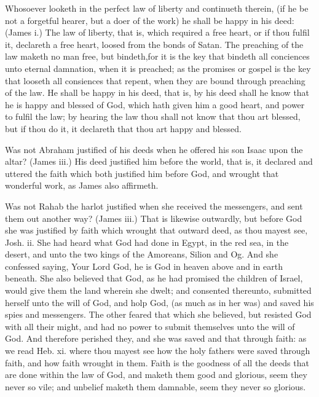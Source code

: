 Whosoever looketh in the perfect law of liberty and continueth
therein, (if he be not a forgetful hearer, but a doer 
of the work) he shall be happy in his deed: (James i.) The 
law of liberty, that is, which required a free heart, or if 
thou fulfil it, declareth a free heart, loosed from the bonds 
of Satan. The preaching of the law maketh no man 
free, but bindeth,for it is the key that bindeth all conciences 
unto eternal damnation, when it is preached; as the promises
or gospel is the key that looseth all consiences that 
repent, when they are bound through preaching of the 
law. He shall be happy in his deed, that is, by his deed shall 
he know that he is happy and blessed of God, which hath 
given him a good heart, and power to fulfil the law; by 
hearing the law thou shall not know that thou art blessed, but 
if thou do it, it declareth that thou art happy and blessed. 

Was not Abraham justified of his deeds when he offered 
his son Isaac upon the altar? (James iii.) His deed justified 
him before the world, that is, it declared and uttered the 
faith which both justified him before God, and wrought that 
wonderful work, as James also affirmeth. 

Was not Rahab the harlot justified when she received the 
messengers, and sent them out another way? (James iii.) 
That is likewise outwardly, but before God she was justified 
by faith which wrought that outward deed, as thou mayest 
see, Josh. ii. She had heard what God had done in 
Egypt, in the red sea, in the desert, and unto the two 
kings of the Amoreans, Silion and Og. And she confessed 
saying, Your Lord God, he is God in heaven above and in 
earth beneath. She also believed that God, as he had 
promised the children of Israel, would give them the land 
wherein she dwelt; and consented thereunto, submitted herself
unto the will of God, and holp God, (as much as in her 
was) and saved his spies and messengers. The other feared 
that which she believed, but resisted God with all their 
might, and had no power to submit themselves unto the will 
of God. And therefore perished they, and she was saved 
and that through faith: as we read Heb. xi. where thou 
mayest see how the holy fathers were saved through faith, and 
how faith wrought in them. Faith is the goodness of all the 
deeds that are done within the law of God, and maketh 
them good and glorious, seem they never so vile; and unbelief
maketh them damnable, seem they never so glorious. 


